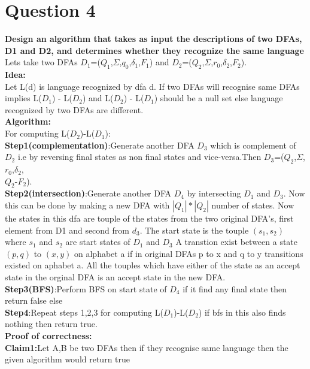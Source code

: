 \documentclass{article}
\begin{document}
\pagebreak
\section{Question 4}
\textbf{Design an algorithm that takes as input the descriptions of two DFAs, D1 and D2, and
determines whether they recognize the same language}\\

Lets take two DFAs $D_1$=($Q_1$,$\Sigma$,$q_0$,$\delta_1$,$F_1$) and $D_2$=($Q_2$,$\Sigma$,$r_0$,$\delta_2$,$F_2$).\\
\textbf{Idea:}\\
Let L(d) is language recognized by dfa d.
If two DFAs will recognise same DFAs implies L($D_1$) - L($D_2$) and L($D_2$) - L($D_1$) should be a null set else language recognized by two DFAs are different.\\
\textbf{Algorithm:}\\
For computing L($D_2$)-L($D_1$):\\
\textbf{Step1(complementation)}:Generate another DFA $D_3$ which is complement of $D_2$ i.e by reversing final states as non final states and vice-versa.Then $D_3$=($Q_2$,$\Sigma$,$r_0$,$\delta_2$,\\$Q_2$-$F_2$).\\
\textbf{Step2(intersection)}:Generate another DFA $D_4$ by intersecting $D_1$ and $D_3$. Now this can be done by making a new DFA with $|Q_1|*|Q_2|$ number of states. Now the states in this dfa are touple of the states 
from the two original DFA's, first element from D1 and second from $d_3$. The start state is the touple $(s_1,s_2)$ where $s_1$ and $s_2$ are start states of $D_1$ and $D_3$
 A transtion exist between a state $(p,q)$ to $(x,y)$ on alphabet a if in original DFAs p to x and q to y transitions existed on aphabet a. 
All the touples which have either of the state as an accept state in the orginal DFA is an accept state in the new DFA.\\
\textbf{Step3(BFS)}:Perform BFS on start state of $D_4$ if it find any final state then return false else \\
\textbf{Step4}:Repeat steps 1,2,3 for computing L($D_1$)-L($D_2$) if bfs in this also finds nothing then return true.\\
\textbf{Proof of correctness:}\\
\textbf{Claim1:}Let A,B be two DFAs then if they recognise same language then the given algorithm would return true\\
\end{document}
